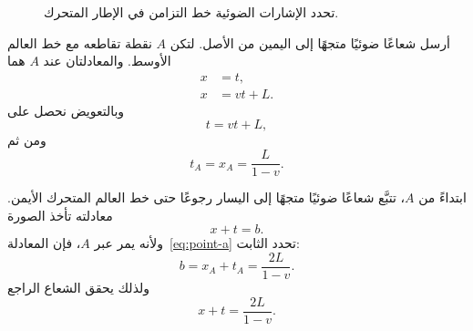 \begin{figure}[H]
\centering
{}
\caption{تحدد الإشارات الضوئية خط التزامن في الإطار المتحرك.}
\end{figure}

أرسل شعاعًا ضوئيًا متجهًا إلى اليمين من الأصل. لتكن \(A\) نقطة تقاطعه مع خط العالم الأوسط. والمعادلتان عند \(A\) هما
\begin{align}
x&=t,\\
x&=vt+L.
\end{align}
وبالتعويض نحصل على
\begin{equation}
t=vt+L,
\end{equation}
ومن ثم
\begin{equation}
t_A=x_A=\frac{L}{1-v}.
\label{eq:point-a}
\end{equation}

ابتداءً من \(A\)، تتبَّع شعاعًا ضوئيًا متجهًا إلى اليسار رجوعًا حتى خط العالم المتحرك الأيمن. معادلته تأخذ الصورة
\begin{equation}
x+t=b.
\end{equation}
ولأنه يمر عبر \(A\)، فإن المعادلة~\eqref{eq:point-a} تحدد الثابت:
\begin{equation}
b=x_A+t_A=\frac{2L}{1-v}.
\end{equation}
ولذلك يحقق الشعاع الراجع
\begin{equation}
x+t=\frac{2L}{1-v}.
\label{eq:backward-ray}
\end{equation}

